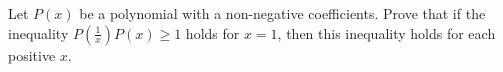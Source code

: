 Let $ P(x)$  be a polynomial with a non-negative coefficients. Prove that if the inequality $ P\left(\frac {1}{x}\right)P(x)\geq 1$ holds for $ x = 1$,  then this inequality holds for each positive $ x$.